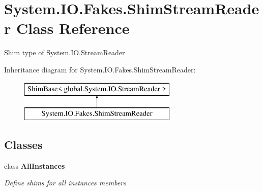 \hypertarget{class_system_1_1_i_o_1_1_fakes_1_1_shim_stream_reader}{\section{System.\-I\-O.\-Fakes.\-Shim\-Stream\-Reader Class Reference}
\label{class_system_1_1_i_o_1_1_fakes_1_1_shim_stream_reader}
}


Shim type of System.\-I\-O.\-Stream\-Reader 


Inheritance diagram for System.\-I\-O.\-Fakes.\-Shim\-Stream\-Reader\-:\begin{figure}[H]
\begin{center}
\leavevmode
\includegraphics[height=2.000000cm]{class_system_1_1_i_o_1_1_fakes_1_1_shim_stream_reader}
\end{center}
\end{figure}
\subsection*{Classes}
\begin{DoxyCompactItemize}
\item 
class {\bfseries All\-Instances}
\begin{DoxyCompactList}\small\item\em Define shims for all instances members\end{DoxyCompactList}\end{DoxyCompactItemize}
